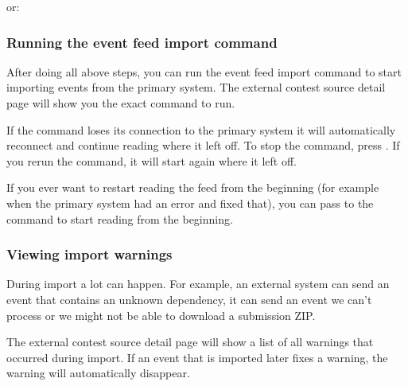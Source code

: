 \documentclass[a4paper,10pt,english,openany]{sphinxmanual}
\begin{document}
\sphinxAtStartPar
or:

\begin{sphinxVerbatim}[commandchars=\\\{\}]
   
   
\end{sphinxVerbatim}


\subsubsection{Running the event feed import command}
\label{\detokenize{shadow:running-the-event-feed-import-command}}
\sphinxAtStartPar
After doing all above steps, you can run the event feed import command to start
importing events from the primary system. The external contest source detail
page will show you the exact command to run.

\sphinxAtStartPar
If the command loses its connection to the primary system it will automatically
reconnect and continue reading where it left off. To stop the command, press
. If you rerun the command, it will start again where it left off.

\sphinxAtStartPar
If you ever want to restart reading the feed from the beginning (for example
when the primary system had an error and fixed that), you can pass
 to the command to start reading from the beginning.


\subsubsection{Viewing import warnings}
\label{\detokenize{shadow:viewing-import-warnings}}
\sphinxAtStartPar
During import a lot can happen. For example, an external system can send an event
that contains an unknown dependency, it can send an event we can’t process or we
might not be able to download a submission ZIP.

\sphinxAtStartPar
The external contest source detail page will show a list of all warnings that
occurred during import. If an event that is imported later fixes a warning, the
warning will automatically disappear.
\end{document}
